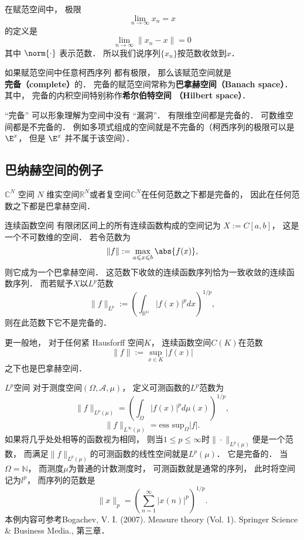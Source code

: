 
在赋范空间中， 极限
\begin{equation}
\lim_{n\to\infty} x_n = x
\end{equation}
的定义是
\begin{equation}
\lim_{n\to\infty} \|{x_n - x}\|= 0
\end{equation}
其中 $\norm{\cdot}$ 表示范数． 所以我们说序列$\{x_n\}$按范数收敛到$x$．

如果赋范空间中任意柯西序列%
都有极限， 那么该赋范空间就是\textbf{完备（complete）}的． 完备的赋范空间常称为\textbf{巴拿赫空间（Banach space）}． 其中， 完备的内积空间特别称作\textbf{希尔伯特空间 （Hilbert space）}．

“完备” 可以形象理解为空间中没有 “漏洞”． 有限维空间都是完备的． 可数维空间都是不完备的． 例如多项式组成的空间就是不完备的（柯西序列的极限可以是 $\E^x$， 但是 $\E^x$ 并不属于该空间）．

\subsection{巴纳赫空间的例子}
\begin{example}{$\mathbb C^N$ 空间}
$N$ 维实空间$\mathbb R^N$或者复空间$\mathbb C^N$在任何范数之下都是完备的， 因此在任何范数之下都是巴拿赫空间．
\end{example}

\begin{example}{连续函数空间}
有限闭区间上的所有连续函数构成的空间记为 $X := C[a, b]$， 这是一个不可数维的空间． 若令范数为
$$
\|{f}\|:= \max_{a \leqslant x \leqslant b} \abs{f(x)},
$$
则它成为一个巴拿赫空间． 这范数下收敛的连续函数序列恰为一致收敛的连续函数序列． 而若赋予$X$以$L^p$范数
$$
\|f\|_{L^p}:=\left(\int_{\mathbb{R^N}}|f(x)|^pdx\right)^{1/p},
$$
则在此范数下它不是完备的．

更一般地， 对于任何紧 Hausforff 空间$K$， 连续函数空间$C(K)$在范数
$$
\|f\|:=\sup_{x\in K}|f(x)|
$$
之下也是巴拿赫空间．
\end{example}

\begin{example}{$L^p$空间}
对于测度空间$(\Omega,\mathcal{A},\mu)$， 定义可测函数的$L^p$范数为
$$
\|f\|_{L^p(\mu)}=\left(\int_\Omega |f(x)|^pd\mu(x)\right)^{1/p},
$$
$$
\|f\|_{L^\infty(\mu)}=\text{ess sup}_{\Omega}|f|.
$$
如果将几乎处处相等的函数视为相同， 则当$1\leq p\leq\infty$时$\|\cdot\|_{L^p(\mu)}$便是一个范数， 而满足$\|f\|_{L^p(\mu)}$的可测函数的线性空间就是$L^p(\mu)$． 它是完备的． 当$\Omega=\mathbb{N}$， 而测度$\mu$为普通的计数测度时， 可测函数就是通常的序列， 此时将空间记为$l^p$， 而序列的范数是
$$
\|x\|_p=\left(\sum_{n=1}^\infty|x(n)|^p\right)^{1/p}.
$$
本例内容可参考Bogachev, V. I. (2007). Measure theory (Vol. 1). Springer Science \& Business Media., 第三章．
\end{example}

